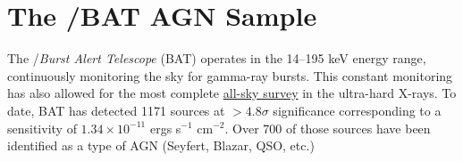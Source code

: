 \section{The \swift/BAT AGN Sample}\label{sample}
The  \swift/\textit{Burst Alert Telescope} (BAT) \cite{Barthelmy_2005,Gehrels_2004} operates in the 14--195 keV energy range, continuously monitoring the sky for gamma-ray bursts. This constant monitoring has also allowed for the most complete \href{https://swift.gsfc.nasa.gov/results/bs70mon/}{all-sky survey} in the ultra-hard X-rays. To date, BAT has detected 1171 sources at  $>4.8\sigma$ significance corresponding to a sensitivity of $1.34\times10^{-11}$ ergs s$^{-1}$ cm$^{-2}$. Over 700 of those sources have been identified as a type of AGN (Seyfert, Blazar, QSO, etc.)
